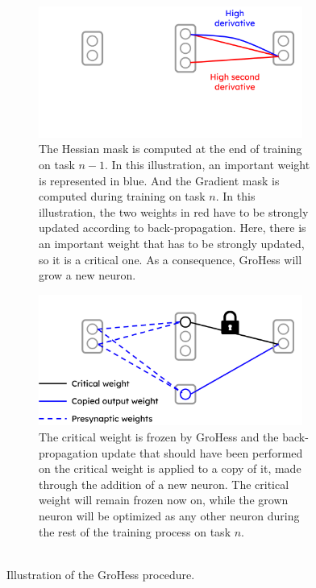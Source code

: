 \documentclass[11pt]{article}
\begin{document}
\begin{figure}
    \centering
    \begin{subfigure}[b]{0.4\textwidth}
        \begin{center}
        \includegraphics[width=0.95\textwidth]{images/GroHess_explication_1.png}
        \end{center}
        \caption{The Hessian mask is computed at the end of training on task $n-1$. In this illustration, an important weight is represented in blue. And the Gradient mask is computed during training on task $n$. In this illustration, the two weights in red have to be strongly updated according to back-propagation. Here, there is an important weight that has to be strongly updated, so it is a critical one. As a consequence, GroHess will grow a new neuron.}
        \label{fig:GroHess_explication_1}
    \end{subfigure}
    \hspace{3mm}
    \begin{subfigure}[b]{0.4\textwidth}
        \begin{center}
        \includegraphics[width=0.95\textwidth]{images/GroHess_explication_2.png}
        \end{center}
        \caption{The critical weight is frozen by GroHess and the back-propagation update that should have been performed on the critical weight is applied to a copy of it, made through the addition of a new neuron. The critical weight will remain frozen now on, while the grown neuron will be optimized as any other neuron during the rest of the training process on task $n$.\\
         \\}
        \label{fig:GroHess_explication_2}
    \end{subfigure}
    \caption{Illustration of the GroHess procedure.}
\end{figure}
\end{document}
